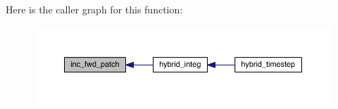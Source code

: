Here is the caller graph for this function\+:\nopagebreak
\begin{figure}[H]
\begin{center}
\leavevmode
\includegraphics[width=350pt]{hybrid__driver_8f90_aeef05e776ee6f7f37ccd5438078c4652_icgraph}
\end{center}
\end{figure}


